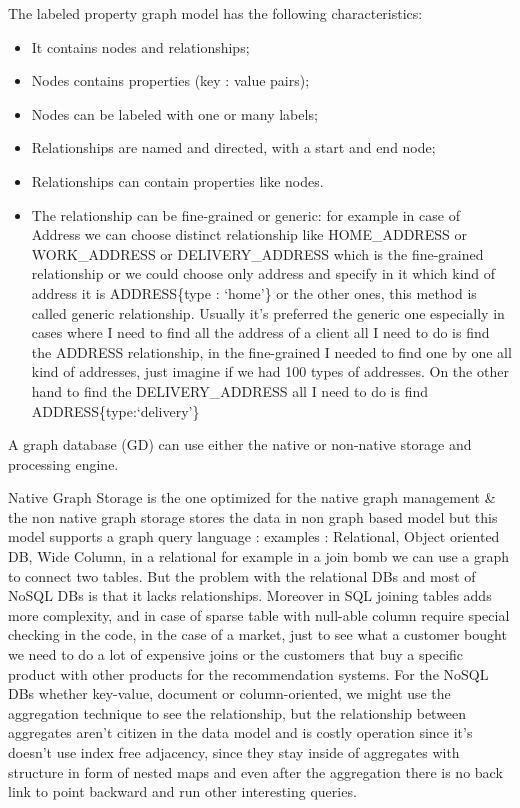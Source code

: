 \documentclass[a4page, 11pt]{article}
\begin{document}
The labeled property graph model has the following characteristics:

\begin{itemize}[noitemsep]
	 
	\item
	It contains nodes and relationships;
	\item
	Nodes contains properties (key : value pairs);
	\item
	Nodes can be labeled with one or many labels;
	\item
	Relationships are named and directed, with a start and end node;
	\item
	Relationships can contain properties like nodes.
	\item
	The relationship can be fine-grained or generic: for example in case of Address we can choose distinct relationship like HOME\_ADDRESS or WORK\_ADDRESS or DELIVERY\_ADDRESS which is the fine-grained relationship or we could choose only address and specify in it which kind of address it is ADDRESS\{type : `home'\} or the other ones, this method is called generic relationship. Usually it's preferred the generic one especially in cases where I need to find all the address
	of a client all I need to do is find the ADDRESS relationship, in the fine-grained I needed to find one by one all kind of addresses, just	imagine if we had 100 types of addresses. On the other hand to find the DELIVERY\_ADDRESS all I need to do is find ADDRESS\{type:`delivery'\} 
\end{itemize}

A graph database (GD) can use either the native or non-native storage
and processing engine.

Native Graph Storage is the one optimized for the native graph
management \& the non native graph storage stores the data in non graph
based model but this model supports a graph query language : examples :
Relational, Object oriented DB, Wide Column, in a relational for example
in a join bomb we can use a graph to connect two tables. But the problem
with the relational DBs and most of NoSQL DBs is that it lacks
relationships. Moreover in SQL joining tables adds more complexity, and
in case of sparse table with null-able column require special checking
in the code, in the case of a market, just to see what a customer bought
we need to do a lot of expensive joins or the customers that buy a
specific product with other products for the recommendation systems. For
the NoSQL DBs whether key-value, document or column-oriented, we might
use the aggregation technique to see the relationship, but the
relationship between aggregates aren't citizen in the data model and is
costly operation since it's doesn't use index free adjacency, since they
stay inside of aggregates with structure in form of nested maps and even
after the aggregation there is no back link to point backward and run
other interesting queries.
\end{document}
